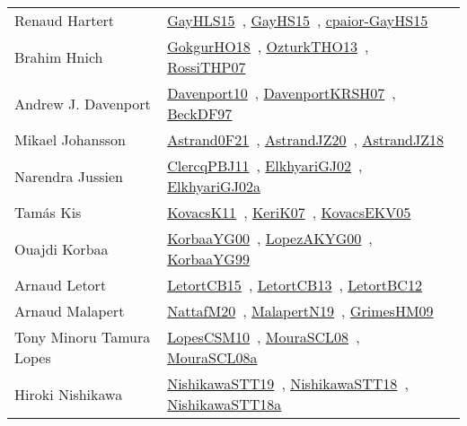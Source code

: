 {\begin{longtable}{p{4cm}p{20cm}}
Renaud Hartert & \href{papers/GayHLS15.pdf}{GayHLS15}~\cite{GayHLS15}, \href{papers/GayHS15.pdf}{GayHS15}~\cite{GayHS15}, \href{papers/cpaior-GayHS15.pdf}{cpaior-GayHS15}~\cite{cpaior-GayHS15}\\
Brahim Hnich & \href{}{GokgurHO18}~\cite{GokgurHO18}, \href{articles/OzturkTHO13.pdf}{OzturkTHO13}~\cite{OzturkTHO13}, \href{papers/RossiTHP07.pdf}{RossiTHP07}~\cite{RossiTHP07}\\
Andrew J. Davenport & \href{papers/Davenport10.pdf}{Davenport10}~\cite{Davenport10}, \href{papers/DavenportKRSH07.pdf}{DavenportKRSH07}~\cite{DavenportKRSH07}, \href{papers/BeckDF97.pdf}{BeckDF97}~\cite{BeckDF97}\\
Mikael Johansson & \href{papers/Astrand0F21.pdf}{Astrand0F21}~\cite{Astrand0F21}, \href{articles/AstrandJZ20.pdf}{AstrandJZ20}~\cite{AstrandJZ20}, \href{papers/AstrandJZ18.pdf}{AstrandJZ18}~\cite{AstrandJZ18}\\
Narendra Jussien & \href{papers/ClercqPBJ11.pdf}{ClercqPBJ11}~\cite{ClercqPBJ11}, \href{papers/ElkhyariGJ02.pdf}{ElkhyariGJ02}~\cite{ElkhyariGJ02}, \href{papers/ElkhyariGJ02a.pdf}{ElkhyariGJ02a}~\cite{ElkhyariGJ02a}\\
Tam{\'{a}}s Kis & \href{articles/KovacsK11.pdf}{KovacsK11}~\cite{KovacsK11}, \href{papers/KeriK07.pdf}{KeriK07}~\cite{KeriK07}, \href{papers/KovacsEKV05.pdf}{KovacsEKV05}~\cite{KovacsEKV05}\\
Ouajdi Korbaa & \href{articles/KorbaaYG00.pdf}{KorbaaYG00}~\cite{KorbaaYG00}, \href{articles/LopezAKYG00.pdf}{LopezAKYG00}~\cite{LopezAKYG00}, \href{papers/KorbaaYG99.pdf}{KorbaaYG99}~\cite{KorbaaYG99}\\
Arnaud Letort & \href{articles/LetortCB15.pdf}{LetortCB15}~\cite{LetortCB15}, \href{papers/LetortCB13.pdf}{LetortCB13}~\cite{LetortCB13}, \href{papers/LetortBC12.pdf}{LetortBC12}~\cite{LetortBC12}\\
Arnaud Malapert & \href{papers/NattafM20.pdf}{NattafM20}~\cite{NattafM20}, \href{papers/MalapertN19.pdf}{MalapertN19}~\cite{MalapertN19}, \href{papers/GrimesHM09.pdf}{GrimesHM09}~\cite{GrimesHM09}\\
Tony Minoru Tamura Lopes & \href{articles/LopesCSM10.pdf}{LopesCSM10}~\cite{LopesCSM10}, \href{papers/MouraSCL08.pdf}{MouraSCL08}~\cite{MouraSCL08}, \href{papers/MouraSCL08a.pdf}{MouraSCL08a}~\cite{MouraSCL08a}\\
Hiroki Nishikawa & \href{}{NishikawaSTT19}~\cite{NishikawaSTT19}, \href{papers/NishikawaSTT18.pdf}{NishikawaSTT18}~\cite{NishikawaSTT18}, \href{papers/NishikawaSTT18a.pdf}{NishikawaSTT18a}~\cite{NishikawaSTT18a}\\

\end{longtable}}
